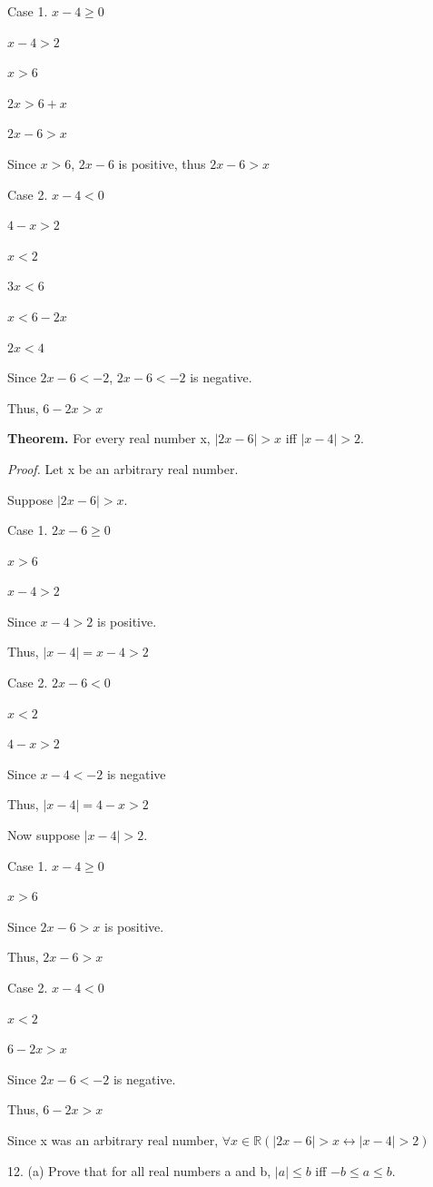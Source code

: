 \documentclass{article}
\begin{document}
Case 1. $x - 4 \geq 0$

$x - 4 > 2$

$x > 6$

$2x > 6 + x$

$2x - 6 > x$

Since $x > 6$, $2x - 6$ is positive, thus $2x - 6 > x$

Case 2. $x - 4 < 0$

$4 - x > 2$

$x < 2$

$3x < 6$

$x < 6 - 2x$

$2x < 4$

Since $2x - 6 < - 2$, $2x - 6 < -2$ is negative. 

Thus, $6 - 2x > x$

\textbf{Theorem.} For every real number x, $|2x - 6| > x$ iff $|x - 4| > 2$.

\textit{Proof.} Let x be an arbitrary real number.

Suppose $|2x - 6| > x$.

Case 1. $2x - 6 \geq 0$

$x > 6$

$x - 4 > 2$

Since $x - 4 > 2$ is positive.

Thus, $|x - 4| = x - 4 > 2$

Case 2. $2x - 6 < 0$

$x < 2$

$4 - x > 2$

Since $x - 4 < -2$ is negative

Thus, $|x - 4| = 4 - x > 2$

Now suppose $|x - 4| > 2$.

Case 1. $x - 4 \geq 0$

$x > 6$

Since $2x - 6 > x$ is positive.

Thus, $2x - 6 > x$

Case 2. $x - 4 < 0$

$x < 2$

$6 - 2x > x$

Since $2x - 6 < -2$ is negative.

Thus, $6 - 2x > x$

Since x was an arbitrary real number, $\forall x \in \mathbb{R}(|2x - 6| > x \leftrightarrow |x - 4| > 2)$

\vspace{30pt}

12. (a) Prove that for all real numbers a and b, $|a| \leq b$ iff $-b \leq a \leq b$.
\end{document}
